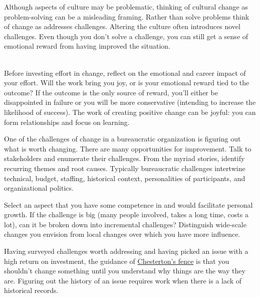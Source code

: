 Although aspects of culture may be problematic, thinking of cultural change as problem-solving can be a misleading framing. Rather than solve problems think of change as addresses challenges. %
Altering the culture often introduces novel challenges.
Even though you don't solve a challenge, you can still get a sense of emotional reward from having improved the situation. 

\ \\

Before investing effort in change, reflect on the emotional and career impact of your effort. Will the work bring you joy, or is your emotional reward tied to the outcome? If the outcome is the only source of reward, you'll either be disappointed in failure or you will be more conservative (intending to increase the likelihood of success). The work of creating positive change can be joyful: you can form relationships and focus on learning. 

One of the challenges of change in a bureaucratic organization is figuring out what is worth changing. There are many opportunities for improvement. Talk to stakeholders and enumerate their challenges.
%
%
From the myriad stories, identify recurring themes and root causes. Typically bureaucratic challenges intertwine technical, budget, staffing, historical context, personalities of participants, and organizational politics. 

Select an aspect that you have some competence in and would facilitate personal growth. If the challenge is big (many people involved, takes a long time, costs a lot), can it be broken down into incremental challenges? Distinguish wide-scale changes you envision from local changes over which you have more influence.

Having surveyed challenges worth addressing and having picked an issue with a high return on investment, the guidance of
\href{https://en.wikipedia.org/wiki/G._K._Chesterton\%23Chesterton\%27s_fence}{Chesterton's fence}
%
%
%
\iftoggle{haspagenumbers}{(page~\pageref{concept:chestertons_fence})}{section~\ref{concept:chestertons_fence}} 
is that you shouldn't change something until you understand why things are the way they are. Figuring out the history of an issue requires work when there is a lack of historical records.


